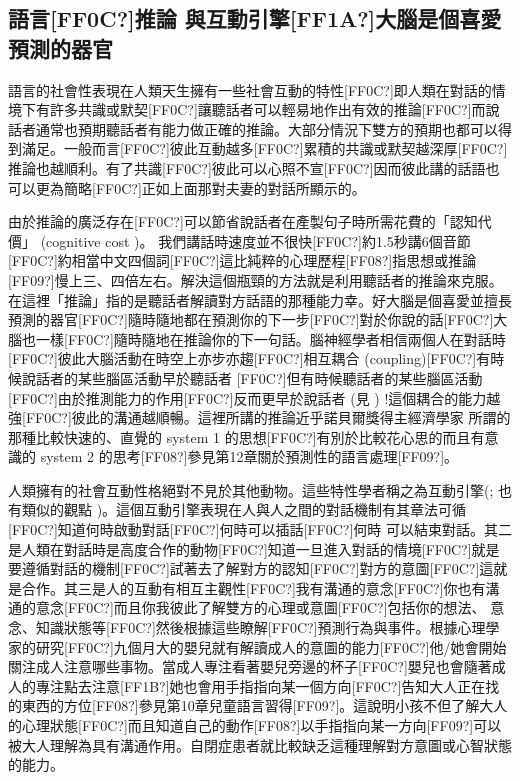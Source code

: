 \subsection{語言[FF0C?]推論 與互動引擎[FF1A?]大腦是個喜愛預測的器官} %

語言的社會性表現在人類天生擁有一些社會互動的特性[FF0C?]即人類在對話的情境下有許多共識或默契[FF0C?]讓聽話者可以輕易地作出有效的推論[FF0C?]而說話者通常也預期聽話者有能力做正確的推論。大部分情況下雙方的預期也都可以得到滿足。一般而言[FF0C?]彼此互動越多[FF0C?]累積的共識或默契越深厚[FF0C?]推論也越順利。有了共識[FF0C?]彼此可以心照不宣[FF0C?]因而彼此講的話語也可以更為簡略[FF0C?]正如上面那對夫妻的對話所顯示的。

由於推論的廣泛存在[FF0C?]可以節省說話者在產製句子時所需花費的「認知代價」 (cognitive cost )。 我們講話時速度並不很快[FF0C?]約1.5秒講6個音節[FF0C?]約相當中文四個詞[FF0C?]這比純粹的心理歷程[FF08?]指思想或推論[FF09?]慢上三、四倍左右。解決這個瓶頸的方法就是利用聽話者的推論來克服。在這裡「推論」指的是聽話者解讀對方話語的那種能力幸。好大腦是個喜愛並擅長預測的器官[FF0C?]隨時隨地都在預測你的下一步[FF0C?]對於你說的話[FF0C?]大腦也一樣[FF0C?]隨時隨地在推論你的下一句話。腦神經學者相信兩個人在對話時[FF0C?]彼此大腦活動在時空上亦步亦趨[FF0C?]相互耦合 (coupling)[FF0C?]有時候說話者的某些腦區活動早於聽話者 [FF0C?]但有時候聽話者的某些腦區活動[FF0C?]由於推測能力的作用[FF0C?]反而更早於說話者 (見 \citealt{StephensEtAl2010}) !這個耦合的能力越強[FF0C?]彼此的溝通越順暢。這裡所講的推論近乎諾貝爾獎得主經濟學家\parencite{Kahneman2011} 所謂的那種比較快速的、直覺的 system 1 的思想[FF0C?]有別於比較花心思的而且有意識的 system 2 的思考[FF08?]參見第12章關於預測性的語言處理[FF09?]。

人類擁有的社會互動性格絕對不見於其他動物。這些特性學者稱之為互動引擎(\citealt{EnfieldLevinson2006}; \citealt{Pagel2012} 也有類似的觀點 )。這個互動引擎表現在人與人之間的對話機制有其章法可循[FF0C?]知道何時啟動對話[FF0C?]何時可以插話[FF0C?]何時 可以結束對話。其二是人類在對話時是高度合作的動物[FF0C?]知道一旦進入對話的情境[FF0C?]就是要遵循對話的機制[FF0C?]試著去了解對方的認知[FF0C?]對方的意圖[FF0C?]這就是合作。其三是人的互動有相互主觀性[FF0C?]我有溝通的意念[FF0C?]你也有溝通的意念[FF0C?]而且你我彼此了解雙方的心理或意圖[FF0C?]包括你的想法、 意念、知識狀態等[FF0C?]然後根據這些瞭解[FF0C?]預測行為與事件。根據心理學家的研究[FF0C?]九個月大的嬰兒就有解讀成人的意圖的能力[FF0C?]他/她會開始關注成人注意哪些事物。當成人專注看著嬰兒旁邊的杯子[FF0C?]嬰兒也會隨著成人的專注點去注意[FF1B?]她也會用手指指向某一個方向[FF0C?]告知大人正在找的東西的方位[FF08?]參見第10章兒童語言習得[FF09?]。這說明小孩不但了解大人的心理狀態[FF0C?]而且知道自己的動作[FF08?]以手指指向某一方向[FF09?]可以被大人理解為具有溝通作用。自閉症患者就比較缺乏這種理解對方意圖或心智狀態的能力。

